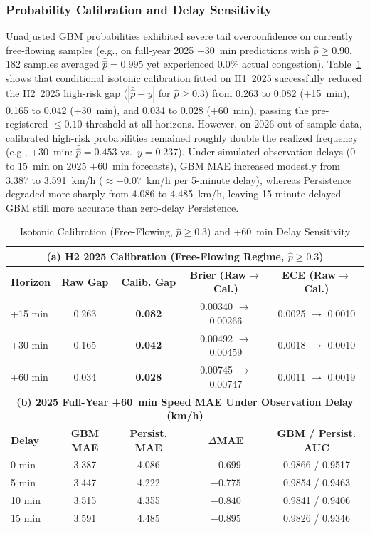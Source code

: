 \documentclass[conference]{IEEEtran}
\begin{document}
\subsubsection{Probability Calibration and Delay Sensitivity}
Unadjusted GBM probabilities exhibited severe tail overconfidence on currently free-flowing samples (e.g., on full-year 2025 $+30$~min predictions with $\hat{p} \ge 0.90$, 182 samples averaged $\bar{\hat{p}} = 0.995$ yet experienced $0.0\%$ actual congestion). Table~\ref{tab:calib_delay} shows that conditional isotonic calibration fitted on H1~2025 successfully reduced the H2~2025 high-risk gap ($|\bar{\hat{p}} - \bar{y}|$ for $\hat{p} \ge 0.3$) from 0.263 to 0.082 (+15~min), 0.165 to 0.042 (+30~min), and 0.034 to 0.028 (+60~min), passing the pre-registered $\le 0.10$ threshold at all horizons. However, on 2026 out-of-sample data, calibrated high-risk probabilities remained roughly double the realized frequency (e.g., $+30$~min: $\bar{\hat{p}} = 0.453$ vs.\ $\bar{y} = 0.237$). Under simulated observation delays (0 to 15~min on 2025 $+60$~min forecasts), GBM MAE increased modestly from 3.387 to 3.591~km/h ($\approx +0.07$~km/h per 5-minute delay), whereas Persistence degraded more sharply from 4.086 to 4.485~km/h, leaving 15-minute-delayed GBM still more accurate than zero-delay Persistence.

\begin{table}[!t]
\caption{Isotonic Calibration (Free-Flowing, $\hat{p}\ge 0.3$) and +60~min Delay Sensitivity}
\label{tab:calib_delay}
\centering
\scriptsize
\setlength{\tabcolsep}{4pt}
\begin{tabular}{lcccc}
\toprule
\multicolumn{5}{c}{\textbf{(a) H2 2025 Calibration (Free-Flowing Regime, $\hat{p} \ge 0.3$)}} \\
\midrule
\textbf{Horizon} & \textbf{Raw Gap} & \textbf{Calib. Gap} & \textbf{Brier (Raw$\to$Cal.)} & \textbf{ECE (Raw$\to$Cal.)} \\
\midrule
+15 min & 0.263 & \textbf{0.082} & 0.00340 $\to$ 0.00266 & 0.0025 $\to$ 0.0010 \\
+30 min & 0.165 & \textbf{0.042} & 0.00492 $\to$ 0.00459 & 0.0018 $\to$ 0.0010 \\
+60 min & 0.034 & \textbf{0.028} & 0.00745 $\to$ 0.00747 & 0.0011 $\to$ 0.0019 \\
\midrule
\multicolumn{5}{c}{\textbf{(b) 2025 Full-Year +60~min Speed MAE Under Observation Delay (km/h)}} \\
\midrule
\textbf{Delay} & \textbf{GBM MAE} & \textbf{Persist. MAE} & \textbf{$\Delta$MAE} & \textbf{GBM / Persist. AUC} \\
\midrule
0 min  & 3.387 & 4.086 & $-0.699$ & 0.9866 / 0.9517 \\
5 min  & 3.447 & 4.222 & $-0.775$ & 0.9854 / 0.9463 \\
10 min & 3.515 & 4.355 & $-0.840$ & 0.9841 / 0.9406 \\
15 min & 3.591 & 4.485 & $-0.895$ & 0.9826 / 0.9346 \\
\bottomrule
\end{tabular}
\end{table}
\end{document}
